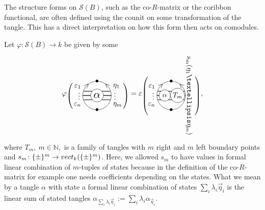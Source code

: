 \documentclass[11pt]{article}
\numberwithin{equation}{section}
\numberwithin{equation}{section}
\begin{document}
\begin{Remark}\label{rmkFormActOnSS}
The structure forms on $\mathscr{S}(B)$, such as the co-$R$-matrix or the coribbon functional, are often defined using the counit on some transformation of the tangle. This has a direct interpretation on how this form then acts on comodules.

Let $\varphi\colon\mathscr{S}(B) \to k$ be given by some
\[
\varphi\raisebox{-3pt}{$\left(\rule{0pt}{22pt}\right.$}\!\!
\begin{tikzpicture}[scale = 0.7, baseline = 0pt]
\draw (0,-1) node{\small $\bullet$} arc(-90:90:1) node[near end, sloped]{\small $<$} node{\small $\bullet$};
\draw (0,-1) arc(-90:-270:1) node[near end, sloped]{\small $>$};
\draw[thick] (-0.94,-0.3)node[below left]{\small $\varepsilon_n$} -- (0.94,-0.3)node[below right]{\small $\eta_m$};
\draw[thick] (-1,0) node[yshift=2pt,left]{\footnotesize $\vdots$} -- (1,0)node[yshift=2pt,right]{\footnotesize $\vdots$};
\draw[thick] (-0.94,0.3) node[above left]{\small $\varepsilon_1$} -- (0.94,0.3)node[above right]{\small $\eta_1$};
\node[circle, fill=white, draw = black, scale = 1.5, inner sep = 1.5pt] (X) at (0,0){$\alpha$};
\end{tikzpicture}\!\!
\raisebox{-3pt}{$\left.\rule{0pt}{22pt}\right)$}
 = \varepsilon
\raisebox{-3pt}{$\left(\rule{0pt}{32pt}\right.$}\!\!\!
\begin{tikzpicture}[scale = 0.7, baseline = 0pt]
\draw (0,-1) node{\small $\bullet$} arc(-90:90:1) node[near end, sloped]{\small $<$} node{\small $\bullet$};
\draw (0,-1) arc(-90:-270:1) node[near end, sloped]{\small $>$};
\draw[thick] (-0.94,-0.3)node[below left]{\small $\varepsilon_n$} -- (0.94,-0.3);
\draw[thick] (-1,0) node[yshift=2pt,left]{\footnotesize $\vdots$} -- (1,0)node[xshift = 5pt, yshift = 0pt, rotate = -90]{\small $s_m(\eta_1 \dots \eta_m)$};
\draw[thick] (-0.94,0.3) node[above left]{\small $\varepsilon_1$} -- (0.94,0.3);
\node[circle, minimum width=0.55cm, fill=white, draw = black, scale = 1, inner sep = 1.5pt] (X) at (-0.45,0){$\alpha$};
\node[circle, minimum width=0.5cm,fill=white, draw = black, scale = 1, inner sep = 1.5pt] at (0.45,0){\small $T_m$};
\end{tikzpicture}\!
\raisebox{-3pt}{$\left.\rule{0pt}{32pt}\right)$},
\]
where $T_m,\ m \in \mathbb{N},$ is a family of tangles with $m$ right and $m$ left boundary points and $s_m\colon \{\pm\}^m\to {\rm vect}_ k(\{\pm\}^m)$. Here, we allowed $s_m$ to have values in formal linear combination of $m$-tuples of states because in the definition of the co-$R$-matrix for example one needs coefficients depending on the states. What we mean by a tangle $\alpha$ with state a formal linear combination of states $\sum_i \lambda_i \vec{\eta}_i$ is the linear sum of stated tangles $\alpha_{\sum_i \lambda_i \vec{\eta}_i} := \sum_i \lambda_i \alpha_{\vec{\eta}_i}$.

\end{Remark}
\end{document}
